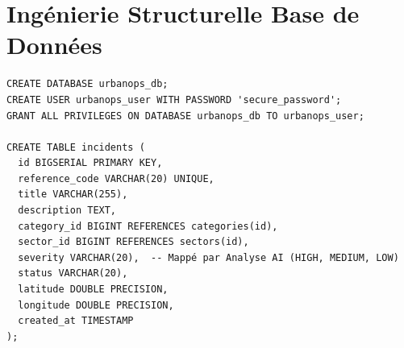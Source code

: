 \documentclass[12pt,a4paper,oneside]{book} %
\begin{document}
\chapter{Ingénierie Structurelle Base de Données}

\begin{lstlisting}[style=sqlurban,caption={Exemple des structures relationnelles majeures persistées en Base (PostgreSQL)}]
CREATE DATABASE urbanops_db;
CREATE USER urbanops_user WITH PASSWORD 'secure_password';
GRANT ALL PRIVILEGES ON DATABASE urbanops_db TO urbanops_user;

CREATE TABLE incidents (
  id BIGSERIAL PRIMARY KEY,
  reference_code VARCHAR(20) UNIQUE,
  title VARCHAR(255),
  description TEXT,
  category_id BIGINT REFERENCES categories(id),
  sector_id BIGINT REFERENCES sectors(id),
  severity VARCHAR(20),  -- Mappé par Analyse AI (HIGH, MEDIUM, LOW)
  status VARCHAR(20),
  latitude DOUBLE PRECISION,
  longitude DOUBLE PRECISION,
  created_at TIMESTAMP
);
\end{lstlisting}
\end{document}

